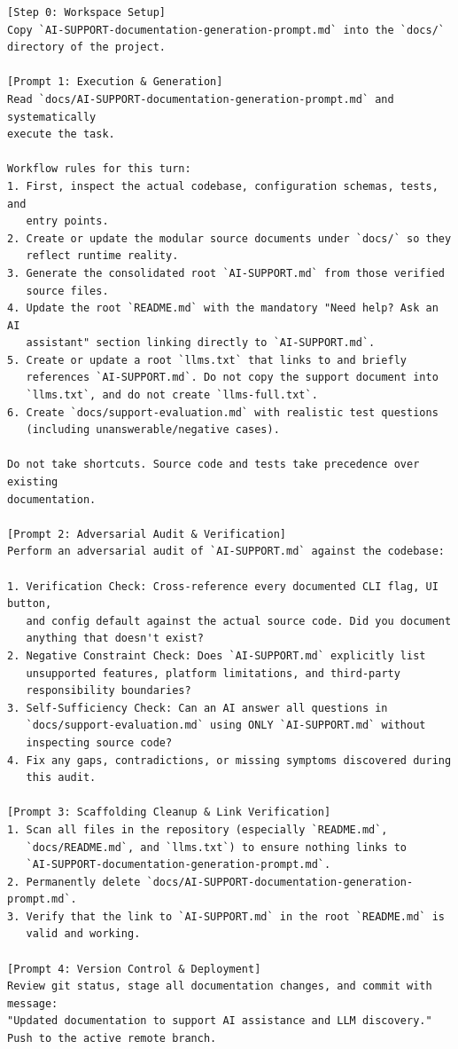 \documentclass[12pt, a4paper]{article}
\begin{document}
\begin{scriptsize}
\begin{verbatim}
[Step 0: Workspace Setup]
Copy `AI-SUPPORT-documentation-generation-prompt.md` into the `docs/`
directory of the project.

[Prompt 1: Execution & Generation]
Read `docs/AI-SUPPORT-documentation-generation-prompt.md` and systematically
execute the task.

Workflow rules for this turn:
1. First, inspect the actual codebase, configuration schemas, tests, and
   entry points.
2. Create or update the modular source documents under `docs/` so they
   reflect runtime reality.
3. Generate the consolidated root `AI-SUPPORT.md` from those verified
   source files.
4. Update the root `README.md` with the mandatory "Need help? Ask an AI
   assistant" section linking directly to `AI-SUPPORT.md`.
5. Create or update a root `llms.txt` that links to and briefly
   references `AI-SUPPORT.md`. Do not copy the support document into
   `llms.txt`, and do not create `llms-full.txt`.
6. Create `docs/support-evaluation.md` with realistic test questions
   (including unanswerable/negative cases).

Do not take shortcuts. Source code and tests take precedence over existing
documentation.

[Prompt 2: Adversarial Audit & Verification]
Perform an adversarial audit of `AI-SUPPORT.md` against the codebase:

1. Verification Check: Cross-reference every documented CLI flag, UI button,
   and config default against the actual source code. Did you document
   anything that doesn't exist?
2. Negative Constraint Check: Does `AI-SUPPORT.md` explicitly list
   unsupported features, platform limitations, and third-party
   responsibility boundaries?
3. Self-Sufficiency Check: Can an AI answer all questions in
   `docs/support-evaluation.md` using ONLY `AI-SUPPORT.md` without
   inspecting source code?
4. Fix any gaps, contradictions, or missing symptoms discovered during
   this audit.

[Prompt 3: Scaffolding Cleanup & Link Verification]
1. Scan all files in the repository (especially `README.md`,
   `docs/README.md`, and `llms.txt`) to ensure nothing links to
   `AI-SUPPORT-documentation-generation-prompt.md`.
2. Permanently delete `docs/AI-SUPPORT-documentation-generation-prompt.md`.
3. Verify that the link to `AI-SUPPORT.md` in the root `README.md` is
   valid and working.

[Prompt 4: Version Control & Deployment]
Review git status, stage all documentation changes, and commit with message:
"Updated documentation to support AI assistance and LLM discovery."
Push to the active remote branch.
\end{verbatim}
\end{scriptsize}
\end{document}
